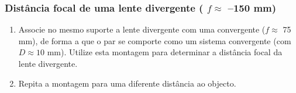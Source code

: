 \documentclass[a4paper,12pt]{article}      %
\begin{document}
\subsubsection{\sf   Distância focal de uma lente divergente ( $f  \approx$ --150 mm) }
\begin{enumerate}
\item Associe  no  mesmo  suporte  a  lente  divergente  com  uma  convergente ($f  \approx$ 75 mm), de  forma a  que  o 
par se comporte como um sistema convergente (com $D\approx 10$ mm). Utilize esta montagem para determinar a distância focal da lente divergente.
\item Repita a montagem para uma diferente distância ao objecto. 


\end{enumerate}
	
\newpage
\def\width{18}
\def\hauteur{25}
\end{document}
